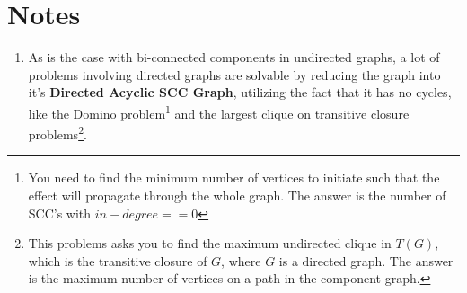 \documentclass[12pt]{book}
\begin{document}
\section{Notes}
\begin{enumerate}[label = \roman*.]
\item As is the case with bi-connected components in undirected graphs, a lot of problems involving directed graphs are solvable by reducing the graph into it's \textbf{Directed Acyclic SCC Graph}, utilizing the fact that it has no cycles, like the Domino problem\footnote{You need to find the minimum number of vertices to initiate such that the effect will propagate through the whole graph. The answer is the number of SCC's with $in-degree == 0$} and the largest clique on transitive closure problems\footnote{This problems asks you to find the maximum undirected clique in $T(G)$, which is the transitive closure of $G$, where $G$ is a directed graph. The answer is the maximum number of vertices on a path in the component graph.}.
\end{enumerate}
\end{document}
